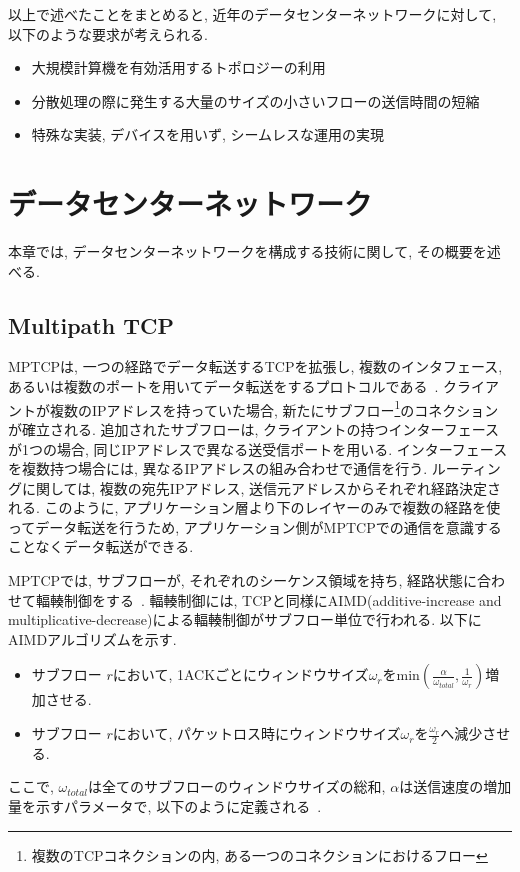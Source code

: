 \documentclass[10pt, a4paper, twocolumn]{jsarticle}
\begin{document}
以上で述べたことをまとめると, 近年のデータセンターネットワークに対して, 以下のような要求が考えられる.
\begin{itemize}
  \item 大規模計算機を有効活用するトポロジーの利用
  \item 分散処理の際に発生する大量のサイズの小さいフローの送信時間の短縮
  \item 特殊な実装, デバイスを用いず, シームレスな運用の実現
\end{itemize}

\section{データセンターネットワーク}
\label{sec:datacenter}
本章では, データセンターネットワークを構成する技術に関して, その概要を述べる.
\subsection{Multipath TCP}
MPTCPは, 一つの経路でデータ転送するTCPを拡張し, 複数のインタフェース,
あるいは複数のポートを用いてデータ転送をするプロトコルである~\cite{mptcp}.
クライアントが複数のIPアドレスを持っていた場合, 新たにサブフロー\footnote{複数のTCPコネクションの内,
ある一つのコネクションにおけるフロー}のコネクションが確立される.
追加されたサブフローは, クライアントの持つインターフェースが1つの場合, 同じIPアドレスで異なる送受信ポートを用いる.
インターフェースを複数持つ場合には, 異なるIPアドレスの組み合わせで通信を行う.
ルーティングに関しては, 複数の宛先IPアドレス, 送信元アドレスからそれぞれ経路決定される.
このように, アプリケーション層より下のレイヤーのみで複数の経路を使ってデータ転送を行うため,
アプリケーション側がMPTCPでの通信を意識することなくデータ転送ができる.

MPTCPでは, サブフローが, それぞれのシーケンス領域を持ち, 経路状態に合わせて輻輳制御をする~\cite{cong}.
輻輳制御には, TCPと同様にAIMD(additive-increase and
multiplicative-decrease)による輻輳制御がサブフロー単位で行われる.
以下にAIMDアルゴリズムを示す.

\begin{itemize}
\item サブフロー $r$において,
1ACKごとにウィンドウサイズ$\omega_{r}$をmin$(\frac{\alpha}{\omega_{total}},
\frac{1}{\omega_r})$増加させる.
\item サブフロー $r$において, パケットロス時にウィンドウサイズ$\omega_r$を$\frac{\omega_r}{2}$へ減少させる.
\end{itemize}
ここで, $\omega_{total}$は全てのサブフローのウィンドウサイズの総和, $\alpha$は送信速度の増加量を示すパラメータで,
以下のように定義される~\cite{cong}.
\end{document}
